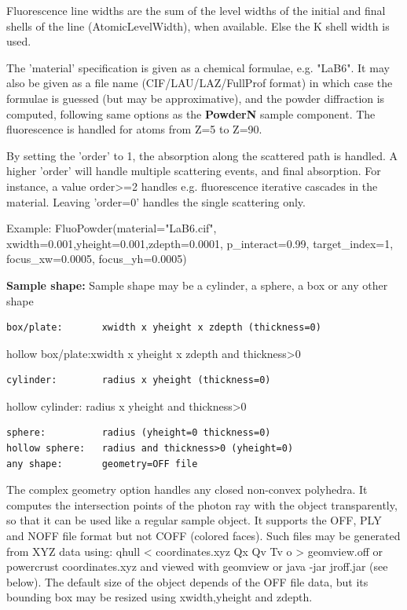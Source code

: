 Fluorescence line widths are the sum of the level widths of the initial and final shells of the line (AtomicLevelWidth), when available. Else the K shell width is used.

The 'material' specification is given as a chemical formulae, e.g. "LaB6". It may also be given as a file name (CIF/LAU/LAZ/FullProf format) in which case the formulae is guessed (but may be approximative), and the powder diffraction is computed, following same options as the \textbf{PowderN} sample component. The fluorescence is handled for atoms from Z=5 to Z=90.

By setting the 'order' to 1, the absorption along the scattered path is handled. A higher 'order' will handle multiple scattering events, and final absorption. For instance, a value order\textgreater{}=2 handles e.g. fluorescence iterative cascades in the material. Leaving 'order=0' handles the single scattering only.

Example: FluoPowder(material="LaB6.cif", xwidth=0.001,yheight=0.001,zdepth=0.0001, p\_interact=0.99, target\_index=1, focus\_xw=0.0005, focus\_yh=0.0005)

\textbf{Sample shape:} Sample shape may be a cylinder, a sphere, a box or any other shape

\begin{verbatim}
box/plate:       xwidth x yheight x zdepth (thickness=0)
\end{verbatim}

hollow box/plate:xwidth x yheight x zdepth and thickness\textgreater{}0

\begin{verbatim}
cylinder:        radius x yheight (thickness=0)
\end{verbatim}

hollow cylinder: radius x yheight and thickness\textgreater{}0

\begin{verbatim}
sphere:          radius (yheight=0 thickness=0)
hollow sphere:   radius and thickness>0 (yheight=0)
any shape:       geometry=OFF file
\end{verbatim}

The complex geometry option handles any closed non-convex polyhedra. It computes the intersection points of the photon ray with the object transparently, so that it can be used like a regular sample object. It supports the OFF, PLY and NOFF file format but not COFF (colored faces). Such files may be generated from XYZ data using: qhull \textless{} coordinates.xyz Qx Qv Tv o \textgreater{} geomview.off or powercrust coordinates.xyz and viewed with geomview or java -jar jroff.jar (see below). The default size of the object depends of the OFF file data, but its bounding box may be resized using xwidth,yheight and zdepth.

